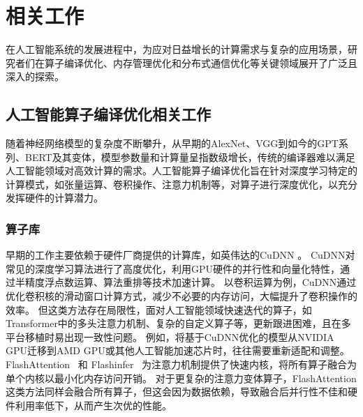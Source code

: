 \chapter{相关工作}


在人工智能系统的发展进程中，为应对日益增长的计算需求与复杂的应用场景，研究者们在算子编译优化、内存管理优化和分布式通信优化等关键领域展开了广泛且深入的探索。

\section{人工智能算子编译优化相关工作}

随着神经网络模型的复杂度不断攀升，从早期的AlexNet、VGG到如今的GPT系列、BERT及其变体，模型参数量和计算量呈指数级增长，传统的编译器难以满足人工智能领域对高效计算的需求。人工智能算子编译优化旨在针对深度学习特定的计算模式，如张量运算、卷积操作、注意力机制等，对算子进行深度优化，以充分发挥硬件的计算潜力。


\subsection{算子库}

早期的工作主要依赖于硬件厂商提供的计算库，如英伟达的CuDNN \cite{chetlur2014cudnn}。
CuDNN对常见的深度学习算法进行了高度优化，利用GPU硬件的并行性和向量化特性，通过半精度浮点数运算、算法重排等技术加速计算。
以卷积运算为例，CuDNN通过优化卷积核的滑动窗口计算方式，减少不必要的内存访问，大幅提升了卷积操作的效率。
但这类方法存在局限性，面对人工智能领域快速迭代的算子，如Transformer中的多头注意力机制、复杂的自定义算子等，更新跟进困难，且在多平台移植时易出现一致性问题。
例如，将基于CuDNN优化的模型从NVIDIA GPU迁移到AMD GPU或其他人工智能加速芯片时，往往需要重新适配和调整。
FlashAttention~\cite{dao2022flashattention, dao2023flashattention, shah2024flashattention} 和 Flashinfer~\cite{ye2025flashinfer} 为注意力机制提供了快速内核，将所有算子融合为单个内核以最小化内存访问开销。
对于更复杂的注意力变体算子，FlashAttention 这类方法同样会融合所有算子，但这会因为数据依赖，导致融合后并行性不佳和硬件利用率低下，从而产生次优的性能。

